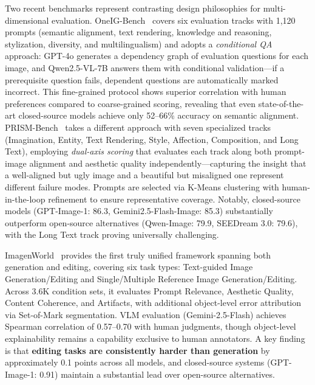 \documentclass{llmxive}
\begin{document}
Two recent benchmarks represent contrasting design philosophies for multi-dimensional evaluation. OneIG-Bench~\citep{OneIG-Bench} covers six evaluation tracks with 1,120 prompts (semantic alignment, text rendering, knowledge and reasoning, stylization, diversity, and multilingualism) and adopts a \emph{conditional QA} approach: GPT-4o generates a dependency graph of evaluation questions for each image, and Qwen2.5-VL-7B answers them with conditional validation---if a prerequisite question fails, dependent questions are automatically marked incorrect. This fine-grained protocol shows superior correlation with human preferences compared to coarse-grained scoring, revealing that even state-of-the-art closed-source models achieve only 52--66\% accuracy on semantic alignment. PRISM-Bench~\citep{FLUX-Reason-6M_PRISM-Bench} takes a different approach with seven specialized tracks (Imagination, Entity, Text Rendering, Style, Affection, Composition, and Long Text), employing \emph{dual-axis scoring} that evaluates each track along both prompt-image alignment and aesthetic quality independently---capturing the insight that a well-aligned but ugly image and a beautiful but misaligned one represent different failure modes. Prompts are selected via K-Means clustering with human-in-the-loop refinement to ensure representative coverage. Notably, closed-source models (GPT-Image-1: 86.3, Gemini2.5-Flash-Image: 85.3) substantially outperform open-source alternatives (Qwen-Image: 79.9, SEEDream 3.0: 79.6), with the Long Text track proving universally challenging.

ImagenWorld~\citep{ImagenWorld} provides the first truly unified framework spanning both generation and editing, covering six task types: Text-guided Image Generation/Editing and Single/Multiple Reference Image Generation/Editing. Across 3.6K condition sets, it evaluates Prompt Relevance, Aesthetic Quality, Content Coherence, and Artifacts, with additional object-level error attribution via Set-of-Mark segmentation. VLM evaluation (Gemini-2.5-Flash) achieves Spearman correlation of 0.57--0.70 with human judgments, though object-level explainability remains a capability exclusive to human annotators. A key finding is that \textbf{editing tasks are consistently harder than generation} by approximately 0.1 points across all models, and closed-source systems (GPT-Image-1: 0.91) maintain a substantial lead over open-source alternatives.
\end{document}
